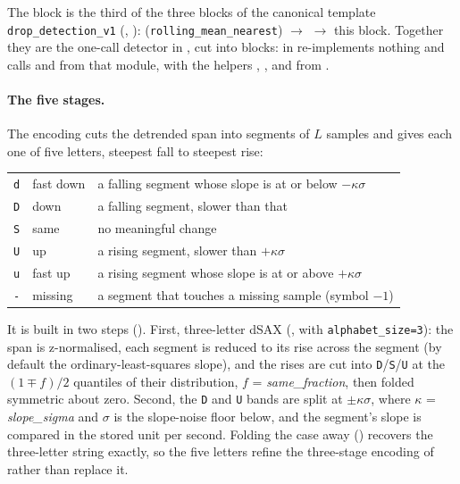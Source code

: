 The block is the third of the three blocks of the canonical template \texttt{drop\_detection\_v1}
(, ):
 (\texttt{rolling\_mean\_nearest}) $\to$
 $\to$ this block. Together they are the one-call detector
 in , cut into blocks:
 in  re-implements nothing and calls
 and  from that module, with the
helpers , ,  and
 from .

\paragraph{The five stages.} The encoding cuts the detrended span into segments of $L$
samples and gives each one of five letters, steepest fall to steepest rise:
\begin{center}
\begin{tabular}{lll}
\texttt{d} & fast down & a falling segment whose slope is at or below $-\kappa\sigma$\\
\texttt{D} & down & a falling segment, slower than that\\
\texttt{S} & same & no meaningful change\\
\texttt{U} & up & a rising segment, slower than $+\kappa\sigma$\\
\texttt{u} & fast up & a rising segment whose slope is at or above $+\kappa\sigma$\\
\texttt{-} & missing & a segment that touches a missing sample (symbol $-1$)
\end{tabular}
\end{center}
It is built in two steps (). First, three-letter dSAX
(,  with
\texttt{alphabet\_size=3}): the span is z-normalised, each segment is reduced to its rise
across the segment (by default the ordinary-least-squares slope), and the rises are cut into
\texttt{D}/\texttt{S}/\texttt{U} at the $(1\mp f)/2$ quantiles of their distribution, $f$ =
\emph{same\_fraction}, then folded symmetric about zero. Second, the \texttt{D} and
\texttt{U} bands are split at $\pm\kappa\sigma$, where $\kappa$ = \emph{slope\_sigma} and
$\sigma$ is the slope-noise floor below, and the segment's slope is compared in the stored
unit per second. Folding the case away () recovers the three-letter
string exactly, so the five letters refine the three-stage encoding of 
rather than replace it.

